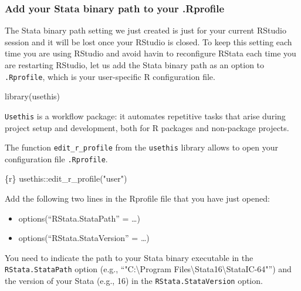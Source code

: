 \documentclass[
  letterpaper,
  DIV=11,
  numbers=noendperiod,
  oneside]{scrreprt}
\newenvironment{Shaded}{\begin{snugshade}}{\end{snugshade}}
\newcommand{\FunctionTok}[1]{\textcolor[rgb]{0.28,0.35,0.67}{#1}}
\newcommand{\InformationTok}[1]{\textcolor[rgb]{0.37,0.37,0.37}{#1}}
\newcommand{\NormalTok}[1]{\textcolor[rgb]{0.00,0.23,0.31}{#1}}
\newcommand{\SpecialCharTok}[1]{\textcolor[rgb]{0.37,0.37,0.37}{#1}}
\newcommand{\StringTok}[1]{\textcolor[rgb]{0.13,0.47,0.30}{#1}}
\providecommand{\tightlist}{%
  \setlength{\itemsep}{0pt}\setlength{\parskip}{0pt}}\usepackage{longtable,booktabs,array}
\begin{document}
\hypertarget{add-your-stata-binary-path-to-your-.rprofile}{%
\subsubsection{Add your Stata binary path to your
.Rprofile}\label{add-your-stata-binary-path-to-your-.rprofile}}

The Stata binary path setting we just created is just for your current
RStudio session and it will be lost once your RStudio is closed. To keep
this setting each time you are using RStudio and avoid havin to
reconfigure RStata each time you are restarting RStudio, let us add the
Stata binary path as an option to \texttt{.Rprofile}, which is your
user-specific R configuration file.

\begin{Shaded}
\begin{Highlighting}[]
\FunctionTok{library}\NormalTok{(usethis)}
\end{Highlighting}
\end{Shaded}

\texttt{Usethis} is a workflow package: it automates repetitive tasks
that arise during project setup and development, both for R packages and
non-package projects.

The function \texttt{edit\_r\_profile} from the \texttt{usethis} library
allows to open your configuration file \texttt{.Rprofile}.

\begin{Shaded}
\begin{Highlighting}[]
\InformationTok{\textasciigrave{}\textasciigrave{}\textasciigrave{}\{r\}}
\NormalTok{usethis}\SpecialCharTok{::}\FunctionTok{edit\_r\_profile}\NormalTok{(}\StringTok{"user"}\NormalTok{)}
\InformationTok{\textasciigrave{}\textasciigrave{}\textasciigrave{}}
\end{Highlighting}
\end{Shaded}

Add the following two lines in the Rprofile file that you have just
opened:

\begin{itemize}
\tightlist
\item
  options(``RStata.StataPath'' = \ldots)
\item
  options(``RStata.StataVersion'' = \ldots)
\end{itemize}

You need to indicate the path to your Stata binary executable in the
\texttt{RStata.StataPath} option (e.g., ``"C:\textbackslash Program
Files\textbackslash Stata16\textbackslash StataIC-64"'') and the version
of your Stata (e.g., 16) in the \texttt{RStata.StataVersion} option.
\end{document}
